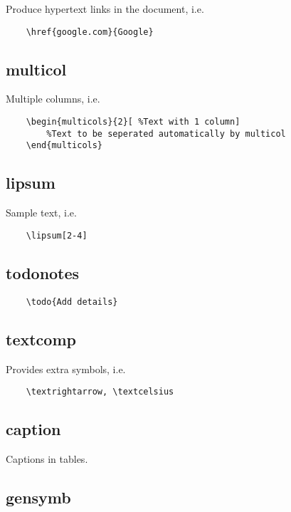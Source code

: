 \documentclass{article}
\begin{document}
Produce hypertext links in the document, i.e.

\begin{verbatim}
	\href{google.com}{Google}
\end{verbatim} 

\subsection{multicol}

Multiple columns, i.e.

\begin{verbatim}
	\begin{multicols}{2}[ %Text with 1 column]	
		%Text to be seperated automatically by multicol 
	\end{multicols}
\end{verbatim}

\subsection{lipsum}

Sample text, i.e.

\begin{verbatim}
	\lipsum[2-4]
\end{verbatim}

\subsection{todonotes}

\begin{verbatim}
	\todo{Add details} 
\end{verbatim}

\subsection{textcomp}

Provides extra symbols, i.e.

\begin{verbatim}
	\textrightarrow, \textcelsius
\end{verbatim}

\subsection{caption}

Captions in tables.

\subsection{gensymb}
\end{document}
